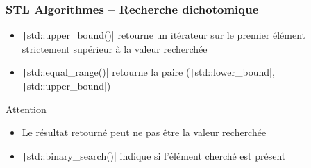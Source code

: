 \documentclass[C++.tex]{subfiles}
\begin{document}
\begin{frame}[fragile]
	\frametitle{STL Algorithmes -- Recherche dichotomique}
	\begin{itemize}
		\item \texttt|std::upper_bound()| retourne un itérateur sur le premier élément strictement supérieur à la valeur recherchée 
		\item \texttt|std::equal_range()| retourne la paire (\texttt|std::lower_bound|, \texttt|std::upper_bound|)
	\end{itemize}

	\begin{alertblock}{Attention}
		\begin{itemize}
			\item Le résultat retourné peut ne pas être la valeur recherchée
		\end{itemize}
	\end{alertblock}

	\begin{itemize}
		\item \texttt|std::binary_search()| indique si l'élément cherché est présent
	\end{itemize}
\end{frame}
\end{document}

